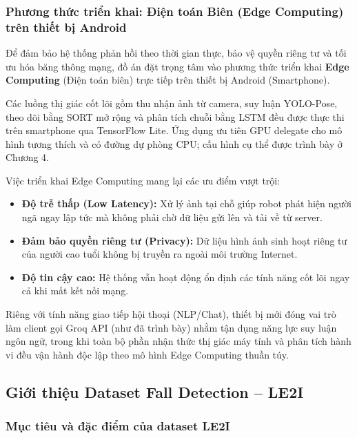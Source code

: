 \subsubsection{Phương thức triển khai: Điện toán Biên (Edge Computing) trên thiết bị Android}
Để đảm bảo hệ thống phản hồi theo thời gian thực, bảo vệ quyền riêng tư và tối ưu hóa băng thông mạng, đồ án đặt trọng tâm vào phương thức triển khai \textbf{Edge Computing} (Điện toán biên) trực tiếp trên thiết bị Android (Smartphone).

Các luồng thị giác cốt lõi gồm thu nhận ảnh từ camera, suy luận YOLO-Pose, theo dõi bằng SORT mở rộng và phân tích chuỗi bằng LSTM đều được thực thi trên smartphone qua TensorFlow Lite. Ứng dụng ưu tiên GPU delegate cho mô hình tương thích và có đường dự phòng CPU; cấu hình cụ thể được trình bày ở Chương 4.

Việc triển khai Edge Computing mang lại các ưu điểm vượt trội:
\begin{itemize}
    \item \textbf{Độ trễ thấp (Low Latency):} Xử lý ảnh tại chỗ giúp robot phát hiện người ngã ngay lập tức mà không phải chờ dữ liệu gửi lên và tải về từ server.
    \item \textbf{Đảm bảo quyền riêng tư (Privacy):} Dữ liệu hình ảnh sinh hoạt riêng tư của người cao tuổi không bị truyền ra ngoài môi trường Internet.
    \item \textbf{Độ tin cậy cao:} Hệ thống vẫn hoạt động ổn định các tính năng cốt lõi ngay cả khi mất kết nối mạng.
\end{itemize}
Riêng với tính năng giao tiếp hội thoại (NLP/Chat), thiết bị mới đóng vai trò làm client gọi Groq API (như đã trình bày) nhằm tận dụng năng lực suy luận ngôn ngữ, trong khi toàn bộ phần nhận thức thị giác máy tính và phân tích hành vi đều vận hành độc lập theo mô hình Edge Computing thuần túy.







\fi
\subsection{Giới thiệu Dataset Fall Detection – LE2I}

\subsubsection{Mục tiêu và đặc điểm của dataset LE2I}

